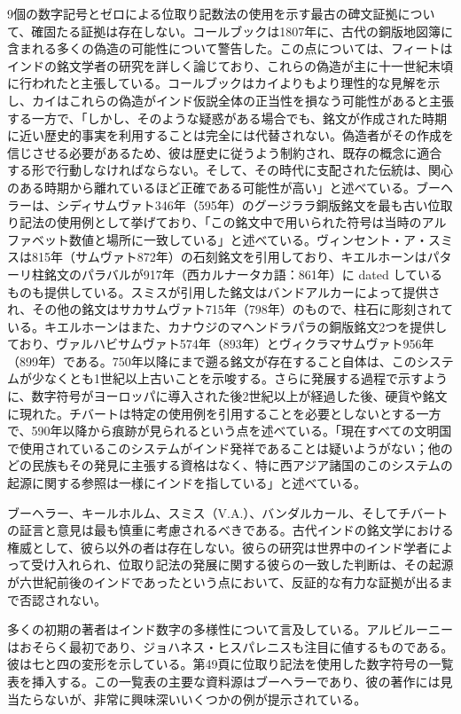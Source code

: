 \documentclass[a4paper,11pt,openany]{ltjsbook}
\begin{document}
9個の数字記号とゼロによる位取り記数法の使用を示す最古の碑文証拠について、確固たる証拠は存在しない。コールブックは1807年に、古代の銅版地図簿に含まれる多くの偽造の可能性について警告した。この点については、フィートはインドの銘文学者の研究を詳しく論じており、これらの偽造が主に十一世紀末頃に行われたと主張している。コールブックはカイよりもより理性的な見解を示し、カイはこれらの偽造がインド仮説全体の正当性を損なう可能性があると主張する一方で、「しかし、そのような疑惑がある場合でも、銘文が作成された時期に近い歴史的事実を利用することは完全には代替されない。偽造者がその作成を信じさせる必要があるため、彼は歴史に従うよう制約され、既存の概念に適合する形で行動しなければならない。そして、その時代に支配された伝統は、関心のある時期から離れているほど正確である可能性が高い」と述べている。ブーヘラーは、シディサムヴァト346年（595年）のグージララ銅版銘文を最も古い位取り記法の使用例として挙げており、「この銘文中で用いられた符号は当時のアルファベット数値と場所に一致している」と述べている。ヴィンセント・ア・スミスは815年（サムヴァト872年）の石刻銘文を引用しており、キエルホーンはパターリ柱銘文のパラバルが917年（西カルナータカ語：861年）に dated しているものも提供している。スミスが引用した銘文はバンドアルカーによって提供され、その他の銘文はサカサムヴァト715年（798年）のもので、柱石に彫刻されている。キエルホーンはまた、カナウジのマヘンドラパラの銅版銘文2つを提供しており、ヴァルハビサムヴァト574年（893年）とヴィクラマサムヴァト956年（899年）である。750年以降にまで遡る銘文が存在すること自体は、このシステムが少なくとも1世紀以上古いことを示唆する。さらに発展する過程で示すように、数字符号がヨーロッパに導入された後2世紀以上が経過した後、硬貨や銘文に現れた。チバートは特定の使用例を引用することを必要としないとする一方で、590年以降から痕跡が見られるという点を述べている。「現在すべての文明国で使用されているこのシステムがインド発祥であることは疑いようがない；他のどの民族もその発見に主張する資格はなく、特に西アジア諸国のこのシステムの起源に関する参照は一様にインドを指している」と述べている。

ブーヘラー、キールホルム、スミス（V.A.）、バンダルカール、そしてチバートの証言と意見は最も慎重に考慮されるべきである。古代インドの銘文学における権威として、彼ら以外の者は存在しない。彼らの研究は世界中のインド学者によって受け入れられ、位取り記法の発展に関する彼らの一致した判断は、その起源が六世紀前後のインドであったという点において、反証的な有力な証拠が出るまで否認されない。

多くの初期の著者はインド数字の多様性について言及している。アルビルーニーはおそらく最初であり、ジョハネス・ヒスパレニスも注目に値するものである。彼は七と四の変形を示している。第49頁に位取り記法を使用した数字符号の一覧表を挿入する。この一覧表の主要な資料源はブーヘラーであり、彼の著作には見当たらないが、非常に興味深いいくつかの例が提示されている。
\end{document}
